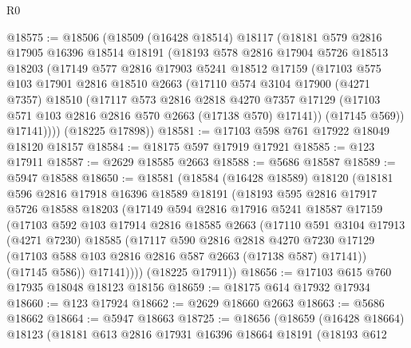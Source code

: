 \begin{lexlean}{R0}
\begin{coremodule}
@18575 := @18506
    (@18509
      (@16428 @18514)
      @18117
      (@18181
        @579
        @2816
        @17905
        @16396
        @18514
        @18191
        (@18193
          @578
          @2816
          @17904
          @5726
          @18513
          @18203
          (@17149
            @577
            @2816
            @17903
            @5241
            @18512
            @17159
            (@17103
              @575
              @103
              @17901
              @2816
              @18510
              @2663
              (@17110
                @574
                @3104
                @17900
                (@4271 @7357)
                @18510
                (@17117
                  @573
                  @2816
                  @2818
                  @4270
                  @7357
                  @17129
                  (@17103 @571 @103 @2816 @2816 @570 @2663 (@17138 @570) @17141))
                (@17145 @569))
              @17141))))
      (@18225 @17898))
@18581 := @17103 @598 @761 @17922 @18049 @18120 @18157
@18584 := @18175 @597 @17919 @17921
@18585 := @123 @17911
@18587 := @2629 @18585 @2663
@18588 := @5686 @18587
@18589 := @5947 @18588
@18650 := @18581
    (@18584
      (@16428 @18589)
      @18120
      (@18181
        @596
        @2816
        @17918
        @16396
        @18589
        @18191
        (@18193
          @595
          @2816
          @17917
          @5726
          @18588
          @18203
          (@17149
            @594
            @2816
            @17916
            @5241
            @18587
            @17159
            (@17103
              @592
              @103
              @17914
              @2816
              @18585
              @2663
              (@17110
                @591
                @3104
                @17913
                (@4271 @7230)
                @18585
                (@17117
                  @590
                  @2816
                  @2818
                  @4270
                  @7230
                  @17129
                  (@17103 @588 @103 @2816 @2816 @587 @2663 (@17138 @587) @17141))
                (@17145 @586))
              @17141))))
      (@18225 @17911))
@18656 := @17103 @615 @760 @17935 @18048 @18123 @18156
@18659 := @18175 @614 @17932 @17934
@18660 := @123 @17924
@18662 := @2629 @18660 @2663
@18663 := @5686 @18662
@18664 := @5947 @18663
@18725 := @18656
    (@18659
      (@16428 @18664)
      @18123
      (@18181
        @613
        @2816
        @17931
        @16396
        @18664
        @18191
        (@18193
          @612

\end{coremodule}
\end{lexlean}
